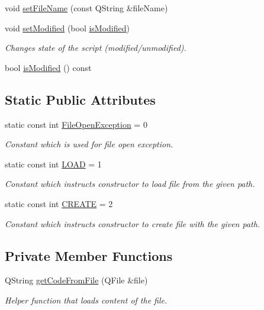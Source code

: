 \begin{DoxyCompactItemize}
void \hyperlink{class_script_abc3444fcb6faaa74c348a213d7f031a6}{set\-File\-Name} (const Q\-String \&file\-Name)
\item 
void \hyperlink{class_script_a6d238ee550711d495c720598be7d9f21}{set\-Modified} (bool \hyperlink{class_script_a4affbe0aa40b4b64ed99a8f5a488aa0f}{is\-Modified})
\begin{DoxyCompactList}\small\item\em Changes state of the script (modified/unmodified). \end{DoxyCompactList}\item 
bool \hyperlink{class_script_a4affbe0aa40b4b64ed99a8f5a488aa0f}{is\-Modified} () const 
\end{DoxyCompactItemize}
\subsection*{Static Public Attributes}
\begin{DoxyCompactItemize}
\item 
static const int \hyperlink{class_script_a1be7d65c8f9b0db216570980815aacb6}{File\-Open\-Exception} = 0
\begin{DoxyCompactList}\small\item\em Constant which is used for file open exception. \end{DoxyCompactList}\item 
static const int \hyperlink{class_script_a95987e80ff92f659bf2366e6b4a42bb1}{L\-O\-A\-D} = 1
\begin{DoxyCompactList}\small\item\em Constant which instructs constructor to load file from the given path. \end{DoxyCompactList}\item 
static const int \hyperlink{class_script_a5e2d0b611f3dadbc9e79ffe28e1e5257}{C\-R\-E\-A\-T\-E} = 2
\begin{DoxyCompactList}\small\item\em Constant which instructs constructor to create file with the given path. \end{DoxyCompactList}\end{DoxyCompactItemize}
\subsection*{Private Member Functions}
\begin{DoxyCompactItemize}
\item 
Q\-String \hyperlink{class_script_a0f4c15a406618ff705b1dec27855683a}{get\-Code\-From\-File} (Q\-File \&file)
\begin{DoxyCompactList}\small\item\em Helper function that loads content of the file. \end{DoxyCompactList}\end{DoxyCompactItemize}
